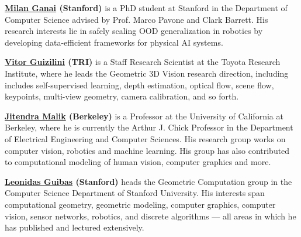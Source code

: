 \documentclass[runningheads]{llncs}
\begin{document}
\vspace{-0.5em}
\textbf{%
\href{https://milanganai.github.io/}
{\textcolor{emailblue}{Milan Ganai}} (Stanford)
}%
is a PhD student at Stanford in the Department of Computer Science advised by Prof. Marco Pavone and Clark Barrett. His research interests lie in safely scaling OOD generalization in robotics by developing data-efficient frameworks for physical AI systems. 

\vspace{-0.5em}
\textbf{%
\href{https://vitorguizilini.github.io/}
{\textcolor{emailblue}{Vitor Guizilini}} (TRI)
}%
is a Staff Research Scientist at the Toyota Research Institute, where he leads the Geometric 3D Vision research direction, including includes self-supervised learning, depth estimation, optical flow, scene flow, keypoints, multi-view geometry, camera calibration, and so forth.

\vspace{-0.5em}
\textbf{%
\href{https://people.eecs.berkeley.edu/~malik/}
{\textcolor{emailblue}{Jitendra Malik}} (Berkeley)
}%
is a Professor at the University of California at Berkeley, where he is currently the Arthur J. Chick Professor in the Department of Electrical Engineering and Computer Sciences.
His research group works on computer vision, robotics and machine learning. His group has also contributed to computational modeling of human vision, computer graphics and more.

\vspace{-0.5em}
\textbf{%
\href{https://geometry.stanford.edu/?member=guibas}
{\textcolor{emailblue}{Leonidas Guibas}} (Stanford)
}%
heads the Geometric Computation group in the Computer Science Department of Stanford University. His interests span computational geometry, geometric modeling, computer graphics, computer vision, sensor networks, robotics, and discrete algorithms --- all areas in which he has published and lectured extensively. 
\end{document}
